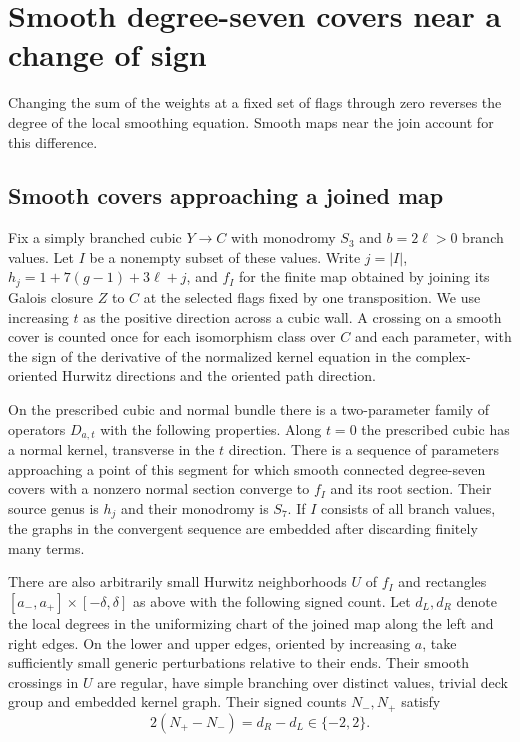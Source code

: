 \section{Smooth degree-seven covers near a change of sign}\label{sec:global}
Changing the sum of the weights at a fixed set of flags through zero reverses the degree of the local smoothing equation. Smooth maps near the join account for this difference.
\subsection{Smooth covers approaching a joined map}\label{p14-sec:smooth}

Fix a simply branched cubic $Y\to C$ with monodromy $S_3$ and
$b=2\ell>0$ branch values. Let $I$ be a nonempty subset of these
values. Write $j=|I|$, $h_j=1+7(g-1)+3\ell+j$, and $f_I$ for the
finite map obtained by joining its Galois closure $Z$ to $C$ at
the selected flags fixed by one transposition. We use increasing
$t$ as the positive direction across a cubic wall. A crossing on a
smooth cover is counted once for each isomorphism class over $C$ and
each parameter, with the sign of the derivative of the normalized
kernel equation in the complex-oriented Hurwitz directions and the
oriented path direction.

\begin{theorem}\label{p14-thm:smooth-covers}
On the prescribed cubic and normal bundle there is a two-parameter
family of operators $D_{a,t}$ with the following properties.
Along $t=0$ the prescribed cubic has a normal kernel, transverse in
the $t$ direction. There is a sequence of parameters approaching a point
of this segment for which smooth connected degree-seven covers with a
nonzero normal section converge to $f_I$ and its root section. Their source genus is $h_j$ and their monodromy
is $S_7$. If $I$ consists of all branch values, the graphs in the
convergent sequence are embedded after discarding finitely many terms.

There are also arbitrarily small Hurwitz neighborhoods $U$ of $f_I$
and rectangles $[a_-,a_+]\times[-\delta,\delta]$ as above with the
following signed count. Let $d_L,d_R$ denote the local degrees in the
uniformizing chart of the joined map along the left and right edges.
On the lower and upper edges, oriented by increasing $a$, take
sufficiently small generic perturbations relative to their ends.
Their smooth crossings in $U$ are regular, have simple branching over
distinct values, trivial deck group and embedded kernel graph. Their
signed counts $N_-,N_+$ satisfy
\begin{equation}\label{p14-eq:smooth-edge}
                 2(N_+-N_-)=d_R-d_L\in\{-2,2\}.
\end{equation}
\end{theorem}

